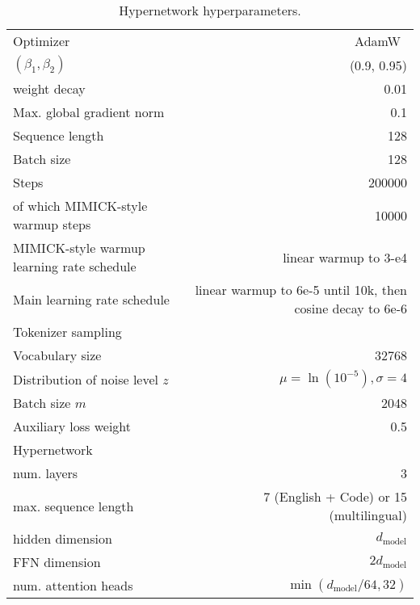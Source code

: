 \begin{table}[h]
\caption{Hypernetwork hyperparameters.}
\centering
\small
\begin{tabular}{lr}
\toprule
Optimizer & AdamW~\citep{loshchilov2018decoupled}\\
\quad $(\beta_1, \beta_2)$ & (0.9, 0.95)\\
\quad weight decay & 0.01 \\
Max. global gradient norm & 0.1\\
Sequence length & 128\\
Batch size & 128\\
Steps & 200000\\
\quad of which MIMICK-style warmup steps & 10000\\
MIMICK-style warmup learning rate schedule & linear warmup to 3-e4\\
Main learning rate schedule & linear warmup to 6e-5 until 10k, then cosine decay to 6e-6\\
Tokenizer sampling &\\
\quad Vocabulary size & 32768\\
\quad Distribution of noise level $z$ & $\mu=\ln(10^{-5}), \sigma=4$\\
\quad Batch size $m$ & 2048\\
Auxiliary loss weight & 0.5\\
Hypernetwork\\
\quad num. layers & 3\\
\quad max. sequence length & 7 (English + Code) or 15 (multilingual)\\
\quad hidden dimension & $d_{\text{model}}$\\
\quad FFN dimension & $2 d_{\text{model}}$\\
\quad num. attention heads & $\min(d_{\text{model}} / 64, 32)$\\

\bottomrule
\end{tabular}
\label{table:hypernetwork_hyperparameters}
\end{table}